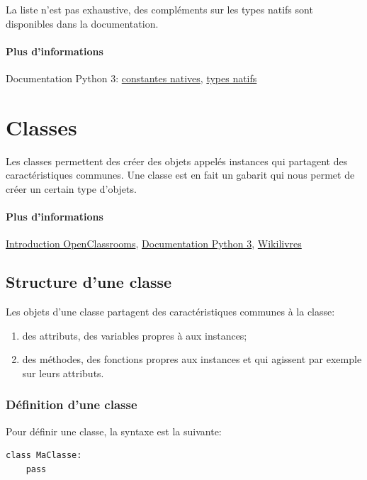 \documentclass[a4paper, 10pt]{article}
\begin{document}
La liste n'est pas exhaustive, des compléments sur les types natifs sont disponibles dans la documentation.

\paragraph{Plus d'informations} Documentation Python 3: \href{https://docs.python.org/fr/3/library/constants.html}{constantes natives}, \href{https://docs.python.org/fr/3/library/stdtypes.html}{types natifs}
%

\section{Classes}

Les classes permettent des créer des objets appelés instances qui partagent des caractéristiques communes. Une classe est en fait un gabarit qui nous permet de créer un certain type d'objets.

\paragraph{Plus d'informations} \href{https://openclassrooms.com/courses/apprenez-a-programmer-en-python/premiere-approche-des-classes}{Introduction OpenClassrooms}, \href{https://docs.python.org/fr/3/tutorial/classes.html}{Documentation Python 3}, \href{https://fr.wikibooks.org/wiki/Programmation_Python/Classes#Définition_d'une_classe_élé mentaire}{Wikilivres}

\subsection{Structure d'une classe}
Les objets d'une classe partagent des caractéristiques communes à la classe:
\begin{enumerate}
    \item des attributs, des variables propres à aux instances;
    \item des méthodes, des fonctions propres aux instances et qui agissent par exemple sur leurs attributs.
\end{enumerate}


\subsubsection{Définition d'une classe}
Pour définir une classe, la syntaxe est la suivante:
\begin{verbatim}
class MaClasse:
    pass
\end{verbatim}
\end{document}

